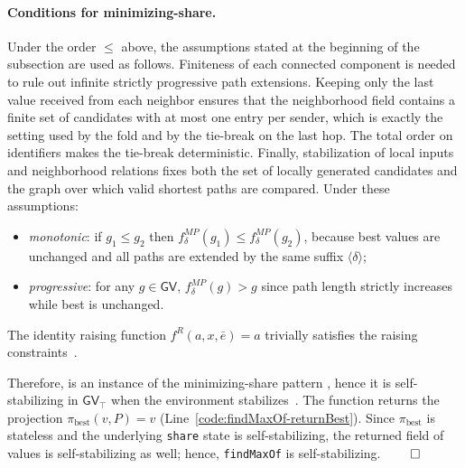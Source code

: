\documentclass[runningheads]{llncs}
\newcommand{\seq}[1]{\langle #1 \rangle}      %
\begin{document}
\paragraph{Conditions for minimizing-share.}
Under the order $\le$ above, the assumptions stated at the beginning of the subsection are used as follows.
%
Finiteness of each connected component is needed to rule out infinite strictly progressive path extensions.
%
Keeping only the last value received from each neighbor ensures that the neighborhood field contains
a finite set of candidates with at most one entry per sender,
which is exactly the setting used by the fold and by the tie-break on the last hop.
%
The total order on identifiers makes the tie-break deterministic.
%
Finally, stabilization of local inputs and neighborhood relations
fixes both the set of locally generated candidates and the graph over which valid shortest paths are compared.
%
Under these assumptions:
\begin{itemize}
    \item \emph{monotonic}: if $g_1\le g_2$ then $f^{MP}_\delta(g_1)\le f^{MP}_\delta(g_2)$,
    because best values are unchanged and all paths are extended by the same suffix $\seq{\delta}$;
    \item \emph{progressive}: for any $g\in\mathsf{GV}$, $f^{MP}_\delta(g) > g$ since path length strictly increases while best is unchanged.
\end{itemize}
The identity raising function $f^{R}(a,x,\bar e)=a$ trivially satisfies the raising constraints~\cite{DBLP:journals/tomacs/ViroliABDP18}.

Therefore,  is an instance of the minimizing-share pattern ,
hence it is self-stabilizing in $\mathsf{GV}_\top$ when the environment stabilizes~\cite{DBLP:journals/tomacs/ViroliABDP18,LMCS2020-share}.
%
The function returns the projection $\pi_{\text{best}}(v,P)=v$ (Line~\ref{code:findMaxOf-returnBest}).
Since $\pi_{\text{best}}$ is stateless and the underlying \lstinline|share| state is self-stabilizing,
the returned field of values is self-stabilizing as well;
hence, \lstinline|findMaxOf| is self-stabilizing. $\qed$
\end{document}
